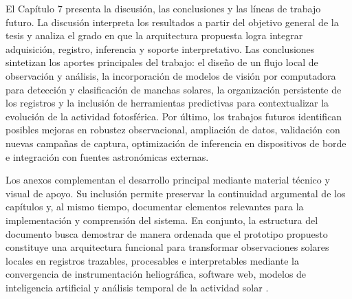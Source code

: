 El Capítulo 7 presenta la discusión, las conclusiones y las líneas de trabajo futuro. La discusión interpreta los resultados a partir del objetivo general de la tesis y analiza el grado en que la arquitectura propuesta logra integrar adquisición, registro, inferencia y soporte interpretativo. Las conclusiones sintetizan los aportes principales del trabajo: el diseño de un flujo local de observación y análisis, la incorporación de modelos de visión por computadora para detección y clasificación de manchas solares, la organización persistente de los registros y la inclusión de herramientas predictivas para contextualizar la evolución de la actividad fotosférica. Por último, los trabajos futuros identifican posibles mejoras en robustez observacional, ampliación de datos, validación con nuevas campañas de captura, optimización de inferencia en dispositivos de borde e integración con fuentes astronómicas externas.

Los anexos complementan el desarrollo principal mediante material técnico y visual de apoyo. Su inclusión permite preservar la continuidad argumental de los capítulos y, al mismo tiempo, documentar elementos relevantes para la implementación y comprensión del sistema. En conjunto, la estructura del documento busca demostrar de manera ordenada que el prototipo propuesto constituye una arquitectura funcional para transformar observaciones solares locales en registros trazables, procesables e interpretables mediante la convergencia de instrumentación heliográfica, software web, modelos de inteligencia artificial y análisis temporal de la actividad solar \citep{hathaway2010solarcycle,clette2014revisiting}.